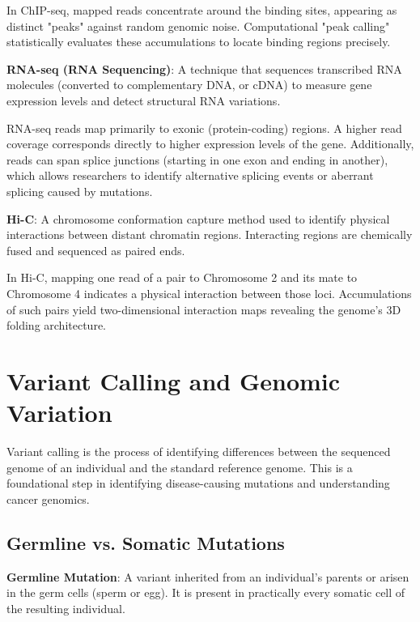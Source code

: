 \documentclass[11pt,a4paper]{article}
\begin{document}
In ChIP-seq, mapped reads concentrate around the binding sites, appearing as distinct "peaks" against random genomic noise. Computational "peak calling" statistically evaluates these accumulations to locate binding regions precisely.

\begin{important}
    \textbf{RNA-seq (RNA Sequencing)}: A technique that sequences transcribed RNA molecules (converted to complementary DNA, or cDNA) to measure gene expression levels and detect structural RNA variations.
\end{important}

RNA-seq reads map primarily to exonic (protein-coding) regions. A higher read coverage corresponds directly to higher expression levels of the gene. Additionally, reads can span splice junctions (starting in one exon and ending in another), which allows researchers to identify alternative splicing events or aberrant splicing caused by mutations.


\begin{important}
    \textbf{Hi-C}: A chromosome conformation capture method used to identify physical interactions between distant chromatin regions. Interacting regions are chemically fused and sequenced as paired ends.
\end{important}

In Hi-C, mapping one read of a pair to Chromosome 2 and its mate to Chromosome 4 indicates a physical interaction between those loci. Accumulations of such pairs yield two-dimensional interaction maps revealing the genome's 3D folding architecture.

\section{Variant Calling and Genomic Variation}
Variant calling is the process of identifying differences between the sequenced genome of an individual and the standard reference genome. This is a foundational step in identifying disease-causing mutations and understanding cancer genomics.

\subsection{Germline vs. Somatic Mutations}
\begin{important}
    \textbf{Germline Mutation}: A variant inherited from an individual's parents or arisen in the germ cells (sperm or egg). It is present in practically every somatic cell of the resulting individual.
\end{important}
\end{document}
